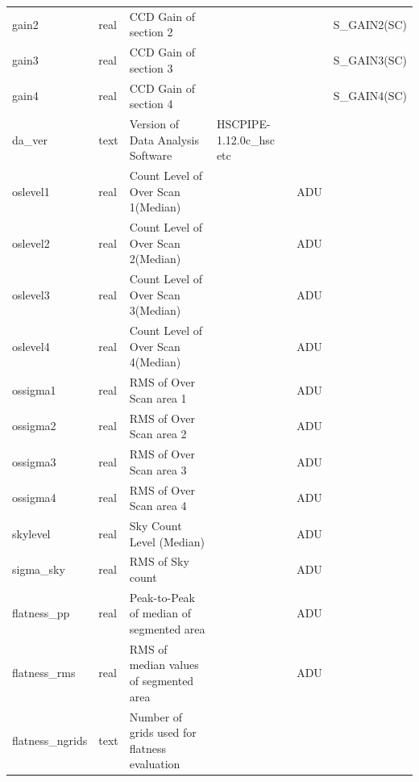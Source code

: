 \documentclass[12pt]{article}
\begin{document}
\begin{table}[thbp]
\begin{center}
{\begin{tabular}{llllll}
gain2 & real & CCD Gain of section 2                               &                            &             & S\_GAIN2(SC)  \\
gain3 & real & CCD Gain of section 3                               &                            &             & S\_GAIN3(SC)  \\
gain4 & real & CCD Gain of section 4                               &                            &             & S\_GAIN4(SC)  \\
da\_ver & text & Version of Data Analysis Software                   & HSCPIPE-1.12.0c\_hsc etc    &             &   \\
oslevel1 & real & Count Level of Over Scan 1(Median)                  &                            & ADU         &   \\
oslevel2 & real & Count Level of Over Scan 2(Median)                  &                            & ADU         &   \\
oslevel3 & real & Count Level of Over Scan 3(Median)                  &                            & ADU         &   \\
oslevel4 & real & Count Level of Over Scan 4(Median)                  &                            & ADU         &   \\
ossigma1 & real & RMS of Over Scan area 1                             &                            & ADU         &   \\
ossigma2 & real & RMS of Over Scan area 2                             &                            & ADU         &   \\
ossigma3 & real & RMS of Over Scan area 3                             &                            & ADU         &   \\
ossigma4 & real & RMS of Over Scan area 4                             &                            & ADU         &   \\
skylevel & real & Sky Count Level (Median)                            &                            & ADU         &   \\
sigma\_sky & real & RMS of Sky count                                    &                            & ADU         &   \\
flatness\_pp & real & Peak-to-Peak of median of segmented area            &                            & ADU         &   \\
flatness\_rms & real & RMS of median values of segmented area              &                            & ADU         &   \\
flatness\_ngrids & text & Number of grids used for flatness evaluation        &                            &             &   \\

\end{tabular}}
\end{center}
\end{table}
\end{document}
